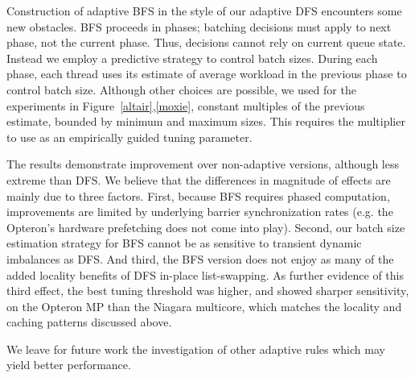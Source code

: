 
Construction of adaptive BFS in the style of our adaptive DFS
encounters some new obstacles.  BFS proceeds in phases; batching
decisions must apply to next phase, not the current phase. Thus,
decisions cannot rely on current queue state.  Instead we employ a
predictive strategy to control batch sizes. During each phase, each
thread uses its estimate of average workload in the previous phase to
control batch size. Although other choices are possible, we used for
the experiments in Figure~\ref{altair},\ref{moxie}, constant multiples of
the previous estimate, bounded by minimum and maximum sizes. This
requires the multiplier to use as an empirically guided tuning
parameter.

The results demonstrate improvement over non-adaptive versions,
although less extreme than DFS.  We believe that the differences in
magnitude of effects are mainly due to three factors. First, because
BFS requires phased computation, improvements are limited by
underlying barrier synchronization rates (e.g.{} the Opteron's hardware
prefetching does not come into play). Second, our batch size
estimation strategy for BFS cannot be as sensitive to transient
dynamic imbalances as DFS.  And third, the BFS version does not enjoy
as many of the added locality benefits of DFS in-place list-swapping.
As further evidence of this third effect, the best tuning threshold
was higher, and showed sharper sensitivity, on the Opteron MP than the
Niagara multicore, which matches the locality and caching patterns
discussed above.

We leave for future work the investigation of other adaptive rules which may yield better performance. 


